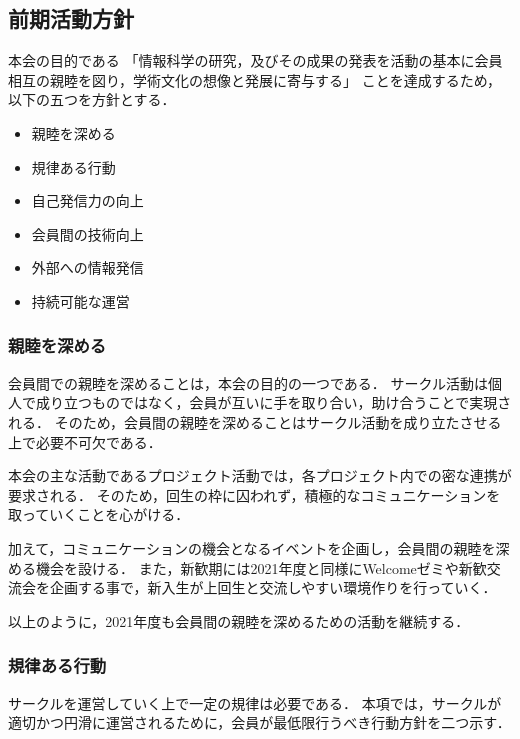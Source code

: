 \subsection*{前期活動方針}



本会の目的である
「情報科学の研究，及びその成果の発表を活動の基本に会員相互の親睦を図り，学術文化の想像と発展に寄与する」
ことを達成するため，以下の五つを方針とする．

\begin{itemize}
  \item 親睦を深める
  \item 規律ある行動
  \item 自己発信力の向上
  \item 会員間の技術向上
  \item 外部への情報発信
  \item 持続可能な運営
\end{itemize}

\subsubsection*{親睦を深める}
会員間での親睦を深めることは，本会の目的の一つである．
サークル活動は個人で成り立つものではなく，会員が互いに手を取り合い，助け合うことで実現される．
そのため，会員間の親睦を深めることはサークル活動を成り立たさせる上で必要不可欠である．

本会の主な活動であるプロジェクト活動では，各プロジェクト内での密な連携が要求される．
そのため，回生の枠に囚われず，積極的なコミュニケーションを取っていくことを心がける．

加えて，コミュニケーションの機会となるイベントを企画し，会員間の親睦を深める機会を設ける．
また，新歓期には2021年度と同様にWelcomeゼミや新歓交流会を企画する事で，新入生が上回生と交流しやすい環境作りを行っていく．

以上のように，2021年度も会員間の親睦を深めるための活動を継続する．

\subsubsection*{規律ある行動}
サークルを運営していく上で一定の規律は必要である．
本項では，サークルが適切かつ円滑に運営されるために，会員が最低限行うべき行動方針を二つ示す．

